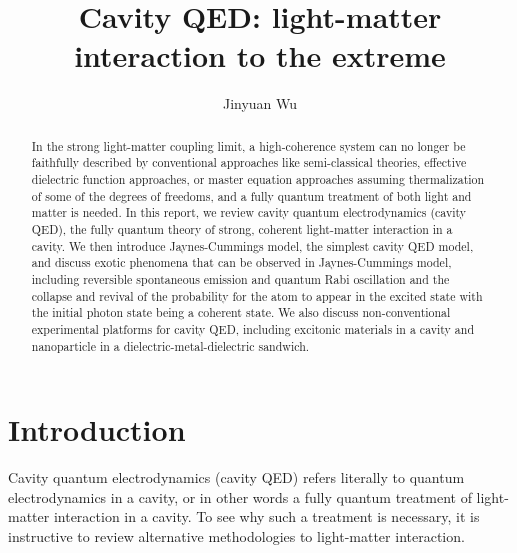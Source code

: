 \documentclass[hyperref, a4paper]{article}
\title{Cavity QED: light-matter interaction to the extreme}
\author{Jinyuan Wu}
\begin{document}
\maketitle

\begin{abstract}
    In the strong light-matter coupling limit,
    a high-coherence system can no longer be faithfully described by conventional approaches 
    like semi-classical theories, 
    effective dielectric function approaches,
    or master equation approaches assuming thermalization of some of the degrees of freedoms,
    and a fully quantum treatment of both light and matter is needed.
    In this report, we review cavity quantum electrodynamics (cavity QED), 
    the fully quantum theory of strong, coherent light-matter interaction in a cavity.
    We then introduce Jaynes-Cummings model, the simplest cavity QED model,
    and discuss exotic phenomena that can be observed in Jaynes-Cummings model,
    including reversible spontaneous emission and quantum Rabi oscillation and
    the collapse and revival of the probability for the atom to appear in the excited state
    with the initial photon state being a coherent state.
    We also discuss non-conventional experimental platforms for cavity QED, 
    including excitonic materials in a cavity 
    and nanoparticle in a dielectric-metal-dielectric sandwich.
\end{abstract}


\section{Introduction}

Cavity quantum electrodynamics (cavity QED) refers literally to 
quantum electrodynamics in a cavity,
or in other words a fully quantum treatment of light-matter interaction in a cavity.
To see why such a treatment is necessary,
it is instructive to review alternative methodologies to light-matter interaction.
\end{document}
